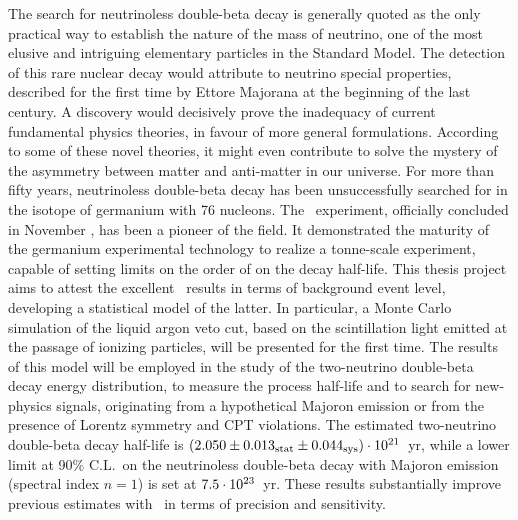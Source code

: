 
The search for neutrinoless double-beta decay is generally quoted as the only practical
way to establish the nature of the mass of neutrino, one of the most elusive and intriguing
elementary particles in the Standard Model. The detection of this rare nuclear decay would
attribute to neutrino special properties, described for the first time by Ettore Majorana
at the beginning of the last century. A discovery would decisively prove the inadequacy of
current fundamental physics theories, in favour of more general formulations. According to
some of these novel theories, it might even contribute to solve the mystery of the
asymmetry between matter and anti-matter in our universe. For more than fifty years,
neutrinoless double-beta decay has been unsuccessfully searched for in the isotope of
germanium with 76 nucleons.  The \gerda\ experiment, officially concluded in November
, has been a pioneer of the field. It demonstrated the maturity of the germanium
experimental technology to realize a tonne-scale experiment, capable of setting limits on
the order of  on the decay half-life. This thesis project aims to attest the
excellent \gerda\ results in terms of background event level, developing a statistical
model of the latter. In particular, a Monte Carlo simulation of the liquid argon veto cut,
based on the scintillation light emitted at the passage of ionizing particles, will be
presented for the first time. The results of this model will be employed in the study of
the two-neutrino double-beta decay energy distribution, to measure the process half-life
and to search for new-physics signals, originating from a hypothetical Majoron emission or
from the presence of Lorentz symmetry and CPT violations. The estimated two-neutrino
double-beta decay half-life is $(2.050 \pm {0.013}_\text{stat} \pm {0.044}_\text{sys}) \cdot 10^{21}$~yr, while a lower limit at 90\% C.L.~on the
neutrinoless double-beta decay with Majoron emission (spectral index $n=1$) is set at
$7.5 \cdot 10^{23}$~yr.  These results substantially improve previous estimates
with \gesix\ in terms of precision and sensitivity.

